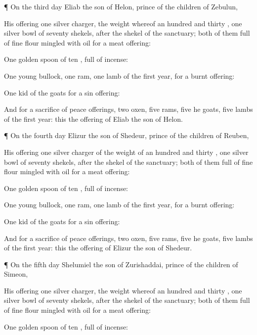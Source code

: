{\par }{\PP {}¶ On the
third
day
Eliab the
son of
Helon,
prince of the
children of
Zebulun,
{}

His
offering
{}
one
silver
charger, the
weight whereof
{} an
hundred and
thirty
{},
one
silver
bowl of
seventy
shekels, after the
shekel of the
sanctuary;
both of them
full of fine
flour
mingled with
oil for a meat
offering:

One
golden
spoon of
ten
{},
full of
incense:

One
young
bullock,
one
ram,
one
lamb of the
first
year, for a burnt
offering:

One
kid of the
goats for a sin
offering:

And for a
sacrifice of peace
offerings,
two
oxen,
five
rams,
five he
goats,
five
lambs of the
first
year: this
{} the
offering of
Eliab the
son of
Helon.


\par }{\PP {}¶ On the
fourth
day
Elizur the
son of
Shedeur,
prince of the
children of
Reuben,
{}

His
offering
{}
one
silver
charger of the
weight of an
hundred and
thirty
{},
one
silver
bowl of
seventy
shekels, after the
shekel of the
sanctuary;
both of them
full of fine
flour
mingled with
oil for a meat
offering:

One
golden
spoon of
ten
{},
full of
incense:

One
young
bullock,
one
ram,
one
lamb of the
first
year, for a burnt
offering:

One
kid of the
goats for a sin
offering:

And for a
sacrifice of peace
offerings,
two
oxen,
five
rams,
five he
goats,
five
lambs of the
first
year: this
{} the
offering of
Elizur the
son of
Shedeur.


\par }{\PP {}¶ On the
fifth
day
Shelumiel the
son of
Zurishaddai,
prince of the
children of
Simeon,
{}

His
offering
{}
one
silver
charger, the
weight whereof
{} an
hundred and
thirty
{},
one
silver
bowl of
seventy
shekels, after the
shekel of the
sanctuary;
both of them
full of fine
flour
mingled with
oil for a meat
offering:

One
golden
spoon of
ten
{},
full of
incense:

}
